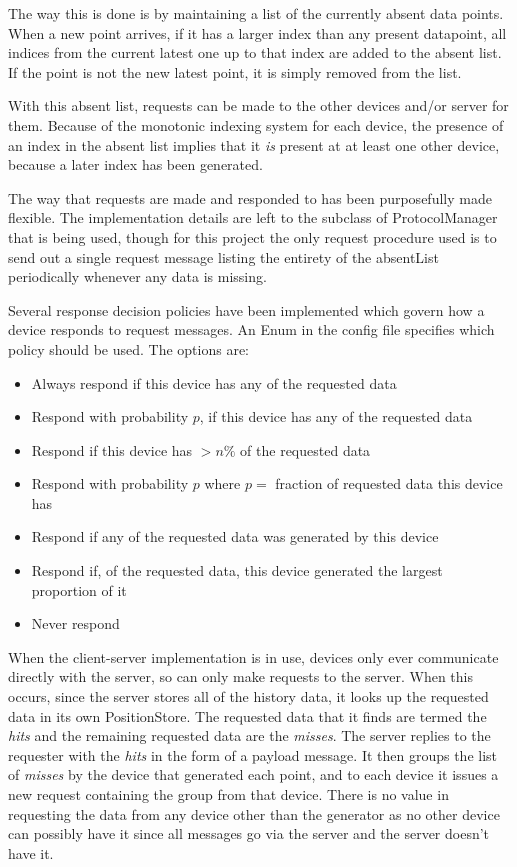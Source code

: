 The way this is done is by maintaining a list of the currently absent data points. When a new point arrives, if it has a larger index than any present datapoint, all indices from the current latest one up to that index are added to the absent list. If the point is not the new latest point, it is simply removed from the list.

With this absent list, requests can be made to the other devices and/or server for them. Because of the monotonic indexing system for each device, the presence of an index in the absent list implies that it \emph{is} present at at least one other device, because a later index has been generated.

The way that requests are made and responded to has been purposefully made flexible. The implementation details are left to the subclass of ProtocolManager that is being used, though for this project the only request procedure used is to send out a single request message listing the entirety of the absentList periodically whenever any data is missing.

Several response decision policies have been implemented which govern how a device responds to request messages. An Enum in the config file specifies which policy should be used. The options are:
\begin{itemize}
\item{Always respond if this device has any of the requested data}
\item{Respond with probability $p$, if this device has any of the requested data}
\item{Respond if this device has $>n \% $ of the requested data}
\item{Respond with probability $p$ where $p=$ fraction of requested data this device has}
\item{Respond if any of the requested data was generated by this device}
\item{Respond if, of the requested data, this device generated the largest proportion of it}
\item{Never respond}
\end{itemize}

When the client-server implementation is in use, devices only ever communicate directly with the server, so can only make requests to the server. When this occurs, since the server stores all of the history data, it looks up the requested data in its own PositionStore. The requested data that it finds are termed the \emph{hits} and the remaining requested data are the \emph{misses}. The server replies to the requester with the \emph{hits} in the form of a payload message. It then groups the list of \emph{misses} by the device that generated each point, and to each device it issues a new request containing the group from that device. There is no value in requesting the data from any device other than the generator as no other device can possibly have it since all messages go via the server and the server doesn't have it.

